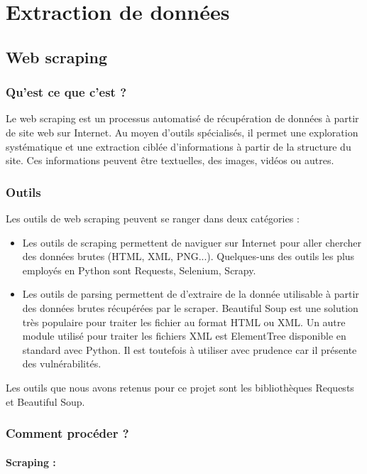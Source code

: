 \section{Extraction de données}
\subsection{Web scraping}
\subsubsection{Qu'est ce que c'est ?}
Le web scraping est un processus automatisé de récupération de données à partir de site web sur Internet. Au moyen d'outils spécialisés, il permet une exploration systématique et une extraction ciblée d'informations à partir de la structure du site. Ces informations peuvent être textuelles, des images, vidéos ou autres.
\subsubsection{Outils}
Les outils de web scraping peuvent se ranger dans deux catégories :
\begin{itemize}
\item Les outils de scraping permettent de naviguer sur Internet pour aller chercher des données brutes (HTML, XML, PNG...). Quelques-uns des outils les plus employés en Python sont Requests, Selenium, Scrapy.
\item Les outils de parsing permettent de d'extraire de la donnée utilisable à partir des données brutes récupérées par le scraper. Beautiful Soup est une solution très populaire pour traiter les fichier au format HTML ou XML. Un autre module utilisé pour traiter les fichiers XML est ElementTree disponible en standard avec Python. Il est toutefois à utiliser avec prudence car il présente des vulnérabilités\cite{XMLProcessingModules}.
\end{itemize}

Les outils que nous avons retenus pour ce projet sont les bibliothèques Requests et Beautiful Soup.

\subsubsection{Comment procéder ?}

\paragraph{Scraping :}

